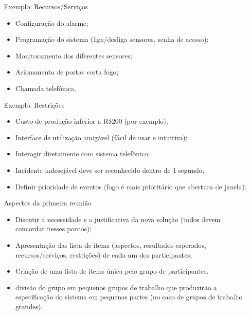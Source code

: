 \documentclass[xcolor=x11names,compress]{beamer}
\begin{document}
\begin{frame}{Exemplo: Recursos/Serviços}

\begin{itemize}
\itemsep 5mm

\item Configuração do alarme;

\item Programação do sistema (liga/desliga sensores, senha de acesso);

\item Monitoramento dos diferentes sensores;

\item Acionamento de portas corta fogo;

\item Chamada telefônica.

\end{itemize}

\end{frame}

\begin{frame}{Exemplo: Restrições}

\begin{itemize}
\itemsep 5mm

\item Custo de produção inferior a R\$200 (por exemplo);

\item Interface de utilização amigável (fácil de usar e intuitiva);

\item Interagir diretamente com sistema telefônico;

\item Incidente indesejável deve ser reconhecido dentro de 1 segundo;

\item Definir prioridade de eventos (fogo é mais prioritário que abertura de janela).

\end{itemize}

\end{frame}

\begin{frame}{Aspectos da primeira reunião}

\begin{itemize}
\itemsep 5mm

\item Discutir a necessidade e a justificativa da nova solução (todos devem concordar nesses pontos);

\item Apresentação das lista de items (aspectos, resultados esperados, recursos/serviços, restrições) de cada um dos participantes;

\item Criação de uma lista de items única pelo grupo de participantes.

\item divisão do grupo em pequenos grupos de trabalho que produzirão a especificação do sistema em pequenas partes (no caso de grupos de trabalho grandes).

\end{itemize}

\end{frame}
\end{document}
